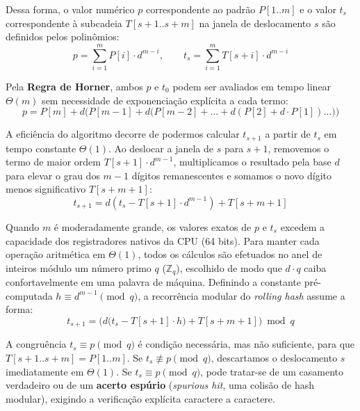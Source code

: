 \documentclass[12pt,a4paper]{article}
\begin{document}
Dessa forma, o valor num\'erico $p$ correspondente ao padr\~ao $P[1..m]$ e o valor $t_s$ correspondente \`a subcadeia $T[s+1..s+m]$ na janela de deslocamento $s$ s\~ao definidos pelos polin\^omios:
\begin{equation}
    p = \sum_{i=1}^{m} P[i] \cdot d^{m-i}, \qquad t_s = \sum_{i=1}^{m} T[s+i] \cdot d^{m-i}
\end{equation}

Pela \textbf{Regra de Horner}, ambos $p$ e $t_0$ podem ser avaliados em tempo linear $\Theta(m)$ sem necessidade de exponencia\c{c}\~ao expl\'icita a cada termo:
\begin{equation}
    p = P[m] + d\Big(P[m-1] + d\big(P[m-2] + \dots + d(P[2] + d \cdot P[1])\dots\big)\Big)
\end{equation}

A efici\^encia do algoritmo decorre de podermos calcular $t_{s+1}$ a partir de $t_s$ em tempo constante $\Theta(1)$. Ao deslocar a janela de $s$ para $s+1$, removemos o termo de maior ordem $T[s+1]\cdot d^{m-1}$, multiplicamos o resultado pela base $d$ para elevar o grau dos $m-1$ d\'igitos remanescentes e somamos o novo d\'igito menos significativo $T[s+m+1]$:
\begin{equation}
    t_{s+1} = d \left(t_s - T[s+1]\cdot d^{m-1}\right) + T[s+m+1]
\end{equation}

Quando $m$ \'e moderadamente grande, os valores exatos de $p$ e $t_s$ excedem a capacidade dos registradores nativos da CPU (64 bits). Para manter cada opera\c{c}\~ao aritm\'etica em $\Theta(1)$, todos os c\'alculos s\~ao efetuados no anel de inteiros m\'odulo um n\'umero primo $q$ ($\mathbb{Z}_q$), escolhido de modo que $d \cdot q$ caiba confortavelmente em uma palavra de m\'aquina. Definindo a constante pr\'e-computada $h \equiv d^{m-1} \pmod q$, a recorr\^encia modular do \textit{rolling hash} assume a forma:
\begin{equation}
    \label{eq:rolling_hash}
    t_{s+1} = \Big(d \big(t_s - T[s+1]\cdot h\big) + T[s+m+1]\Big) \bmod q
\end{equation}

A congru\^encia $t_s \equiv p \pmod q$ \'e condi\c{c}\~ao necess\'aria, mas n\~ao suficiente, para que $T[s+1..s+m] = P[1..m]$. Se $t_s \not\equiv p \pmod q$, descartamos o deslocamento $s$ imediatamente em $\Theta(1)$. Se $t_s \equiv p \pmod q$, pode tratar-se de um casamento verdadeiro ou de um \textbf{acerto esp\'urio} (\textit{spurious hit}, uma colis\~ao de hash modular), exigindo a verifica\c{c}\~ao expl\'icita caractere a caractere.
\end{document}
